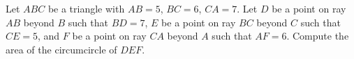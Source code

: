 Let $ABC$ be a triangle with $AB=5$,  $BC=6$,  $CA=7$. Let $D$ be a point on ray $AB$ beyond $B$ such that $BD=7$,  $E$ be a point on ray $BC$ beyond $C$ such that $CE=5$,  and $F$ be a point on ray $CA$ beyond $A$ such that $AF=6$. Compute the area of the circumcircle of $DEF$.